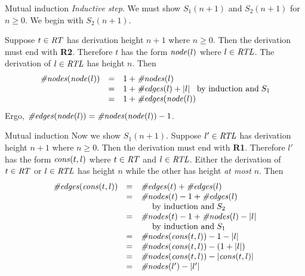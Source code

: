 \documentclass[style=sailor,size=12pt]{powerdot}
\newcommand{\id}[1]{\mbox{\it #1\/}}
\newcommand{\rid}[1]{\mbox{\rm #1}}
\begin{document}
\begin{wideslide}[bm=,toc=]{Mutual induction}
{\em Inductive step}.
We must show $S_1(n+1)$ and $S_2(n+1)$ for $n\geq 0$.
We begin with $S_2(n+1)$.

\vspace{1em}
Suppose $t\in\id{RT}$ has derivation height $n+1$ where $n\geq 0$.
Then the derivation must end with {\bf R2}. 
Therefore $t$ has the form $\id{node}(l)$
where $l\in\id{RTL}$.
The derivation of $l\in\id{RTL}$ has height $n$.
Then
\begin{displaymath}
\begin{array}{lll}
\id{\#nodes}(\id{node}(l)) & = & 1 + \id{\#nodes}(l) \\
	& = & 1+\id{\#edges}(l) + |l|\;\;\;\rid{by induction and}\;S_1 \\
	& = & 1+\id{\#edges}(\id{node}(l))
\end{array}
\end{displaymath}
Ergo, $\id{\#edges}(\id{node}(l))=\id{\#nodes}(\id{node}(l))-1$.
\end{wideslide}

\begin{wideslide}[bm=,toc=]{Mutual induction}
Now we show $S_1(n+1)$.
Suppose $l'\in\id{RTL}$ has derivation height $n+1$ where $n\geq 0$.
Then the derivation must end with {\bf R1}. 
Therefore $l'$ has the form $\id{cons}(t,l)$
where $t\in\id{RT}$ and $l\in\id{RTL}$.
Either the derivation of $t\in\id{RT}$ or $l\in\id{RTL}$ has height $n$ while the other 
has height {\em at most\/} $n$.
Then
\begin{displaymath}
\begin{array}{lll}
\id{\#edges}(\id{cons}(t,l)) & = & \id{\#edges}(t) + \id{\#edges}(l) \\
	& = & \id{\#nodes}(t) - 1 + \id{\#edges}(l) \\
 & & \>\>\>\>\>\>\rid{by induction and}\;S_2 \\
	& = & \id{\#nodes}(t) - 1 + \id{\#nodes}(l) - |l| \\
 & & \>\>\>\>\>\>\rid{by induction and}\;S_1 \\
	& = & \id{\#nodes}(\id{cons}(t,l)) - 1 - |l| \\
	& = & \id{\#nodes}(\id{cons}(t,l)) - (1 + |l|) \\
	& = & \id{\#nodes}(\id{cons}(t,l)) - |\id{cons}(t,l)|\\
	& = & \id{\#nodes}(l') - |l'|
\end{array}
\end{displaymath}
\end{wideslide}
\end{document}
